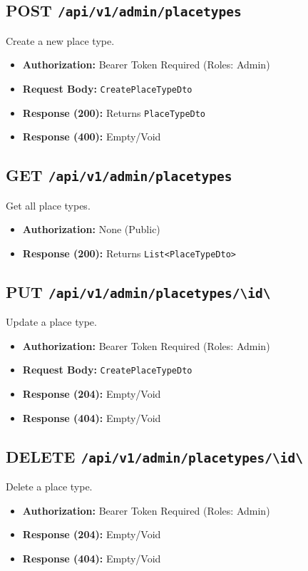 \subsection{POST \texttt{/api/v1/admin/placetypes}}
Create a new place type.
\begin{itemize}
    \item \textbf{Authorization:} Bearer Token Required (Roles: Admin)
    \item \textbf{Request Body:} \texttt{CreatePlaceTypeDto}
    \item \textbf{Response (200):} Returns \texttt{PlaceTypeDto}
    \item \textbf{Response (400):} Empty/Void
\end{itemize}

\subsection{GET \texttt{/api/v1/admin/placetypes}}
Get all place types.
\begin{itemize}
    \item \textbf{Authorization:} None (Public)
    \item \textbf{Response (200):} Returns \texttt{List<PlaceTypeDto>}
\end{itemize}

\subsection{PUT \texttt{/api/v1/admin/placetypes/\textbackslash{}{id\textbackslash{}}}}
Update a place type.
\begin{itemize}
    \item \textbf{Authorization:} Bearer Token Required (Roles: Admin)
    \item \textbf{Request Body:} \texttt{CreatePlaceTypeDto}
    \item \textbf{Response (204):} Empty/Void
    \item \textbf{Response (404):} Empty/Void
\end{itemize}

\subsection{DELETE \texttt{/api/v1/admin/placetypes/\textbackslash{}{id\textbackslash{}}}}
Delete a place type.
\begin{itemize}
    \item \textbf{Authorization:} Bearer Token Required (Roles: Admin)
    \item \textbf{Response (204):} Empty/Void
    \item \textbf{Response (404):} Empty/Void
\end{itemize}


